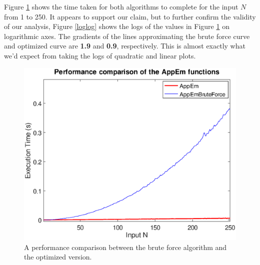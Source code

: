 \documentclass[10pt]{article}
\begin{document}
Figure \ref{fig:emnaive_vs_better} shows   the time taken for both algorithms to complete for the input $N$ from 1 to 250. It appears to support our claim, but to further confirm the validity of our analysis, Figure \ref{loglog} shows the logs of the values in Figure \ref{fig:emnaive_vs_better} on logarithmic axes. The gradients of the lines approximating the brute force curve and optimized curve are \textbf{1.9} and \textbf{0.9}, respectively. This is almost exactly what we'd expect from taking the logs of quadratic and linear plots.

\begin{figure}[!hb]
\centering
   \includegraphics[scale=0.5]{bruteforce_vs_better.eps}

   \caption{A performance comparison between the brute force algorithm and the optimized version.}
      \label{fig:emnaive_vs_better}
\end{figure}
\end{document}
